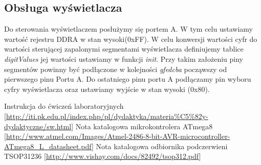 \documentclass[12pt]{article}
\begin{document}
\subsection{Obsługa wyświetlacza}
Do sterowania wyświetlaczem posłużymy się portem A. W tym celu ustawiamy wartość rejestru DDRA w stan wysoki(0xFF). W celu konwersji wartości cyfr do wartości sterującej zapalonymi segmentami wyświetlacza definiujemy tablice \textit{digitValues} jej wartości ustawiamy w funkcji \textit{init}. Przy takim założeniu piny segmentów powinny być podłączone w kolejności \textit{gfedcba} począwszy od pierwszego pinu Portu A. Do ostatniego pinu portu A podłączamy pin wyboru cyfry wyświetlacza oraz ustawiamy wyjście w stan wysoki (0x80).\\



\begin{thebibliography}{99}
 Instrukcja do ćwiczeń laboratoryjnych [\url{http://iti.pk.edu.pl/index.php/pl/dydaktyka/materia%C5%82y-dydaktyczne/sw.html}]
\bibitem{} Nota katalogowa mikrokontrolera ATmega8 [\url{http://www.atmel.com/Images/Atmel-2486-8-bit-AVR-microcontroller-ATmega8_L_datasheet.pdf}]
\bibitem{} Nota katalogowa odbiornika podczerwieni TSOP31236 [\url{http://www.vishay.com/docs/82492/tsop312.pdf}]
\end{thebibliography}
\end{document}
